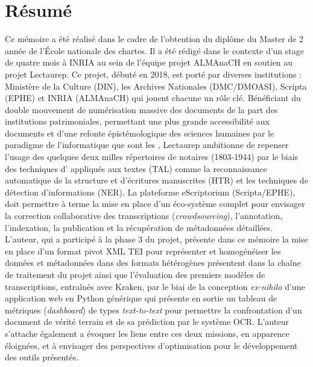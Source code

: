 \chapter*{Résumé}
Ce mémoire a été réalisé dans le cadre de l'obtention du diplôme du Master de 2 année  de l'École nationale des chartes. 
Il a été rédigé dans le contexte d'un stage de quatre mois à INRIA au sein de l'équipe projet ALMAnaCH en soutien au projet Lectaurep.
Ce projet, débuté en 2018, est porté par diverses institutions : Ministère de la Culture (DIN), les Archives Nationales (DMC/DMOASI), Scripta (EPHE) et INRIA (ALMAnaCH) qui jouent chacune un rôle clé. 
Bénéficiant du double mouvement de numérisation massive des documents de la part des institutions patrimoniales, permettant une plus grande accessibilité aux documents et d'une refonte épistémologique des sciences humaines par le paradigme de l'informatique que sont les , Lectaurep ambitionne de repenser l'usage des quelques deux milles répertoires de notaires (1803-1944) par le biais des techniques d' appliqués aux textes (TAL) comme la reconnaissance automatique de la structure et d'écritures manuscrites (HTR) et les techniques de détection d'informations (NER). 
La plateforme eScriptorium (Scripta/EPHE), doit permettre à terme la mise en place d'un éco-système complet pour envisager la correction collaborative des transcriptions (\textit{crowdsourcing}), l'annotation, l'indexation, la publication et la récupération de métadonnées détaillées.
L'auteur, qui a participé à la phase 3 du projet, présente dans ce mémoire la mise en place d'un format pivot XML TEI pour représenter et homogénéiser les données et métadonnées dans des formats hétérogènes présentent dans la chaîne de traitement du projet ainsi que l'évaluation des premiers modèles de transcriptions, entraînés avec Kraken, par le biai de la conception \textit{ex-nihilo} d'une application web en Python générique qui présente en sortie un tableau de métriques (\textit{dashboard}) de types \textit{text-to-text} pour permettre la confrontation d'un document de vérité terrain et de sa prédiction par le système OCR.
L'auteur s'attache également a évoquer les liens entre ces deux missions, en apparence éloignées, et à envisager des perspectives d'optimisation pour le développement des outils présentés.\\



